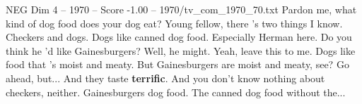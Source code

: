 \begin{textsample}{NEG Dim 4 – 1970 – Score -1.00 – 1970/tv\_com\_1970\_70.txt}  \label{ex:f4_neg_060}
Pardon me, what kind of dog food does your dog eat?
Young fellow, there 's two things I know.
Checkers and dogs.
Dogs like canned dog food.
Especially Herman here.
Do you think he 'd like Gainesburgers?
Well, he might.
Yeah, leave this to me.
Dogs like food that 's moist and meaty.
But Gainesburgers are moist and meaty, see?
Go ahead, but...
And they taste \textbf{terrific}.
And you don't know nothing about checkers, neither.
Gainesburgers dog food.
The canned dog food without the...

\end{textsample}
